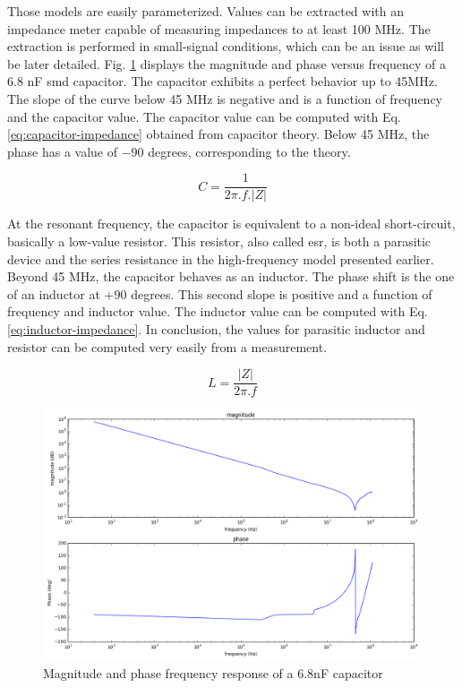 Those models are easily parameterized.
Values can be extracted with an impedance meter capable of measuring impedances to at least 100 MHz.
The extraction is performed in small-signal conditions, which can be an issue as will be later detailed.
Fig. \ref{fig:frequency-response-capa} displays the magnitude and phase versus frequency of a 6.8 nF \gls{smd} capacitor.
The capacitor exhibits a perfect behavior up to 45MHz.
The slope of the curve below 45 MHz is negative and is a function of frequency and the capacitor value.
The capacitor value can be computed with Eq. \ref{eq:capacitor-impedance} obtained from capacitor theory.
Below 45 MHz, the phase has a value of $-90$ degrees, corresponding to the theory.

\begin{equation}
C = \frac{1}{2\pi .f.\lvert Z \rvert}
\label{eq:capacitor-impedance}
\end{equation}

At the resonant frequency, the capacitor is equivalent to a non-ideal short-circuit, basically a low-value resistor.
This resistor, also called \gls{esr}, is both a parasitic device and the series resistance in the high-frequency model presented earlier.
Beyond 45 MHz, the capacitor behaves as an inductor.
The phase shift is the one of an inductor at $+90$ degrees.
This second slope is positive and a function of frequency and inductor value.
The inductor value can be computed with Eq. \ref{eq:inductor-impedance}.
In conclusion, the values for parasitic inductor and resistor can be computed very easily from a measurement.

\begin{equation}
L = \frac{\lvert Z \rvert}{2\pi .f}
\label{eq:inductor-impedance}
\end{equation}

\begin{figure}[!h]
  \centering
  \includegraphics[width=\textwidth]{src/2/figures/capa_hf_response.png}
  \caption{Magnitude and phase frequency response of a 6.8nF capacitor}
  \label{fig:frequency-response-capa}
\end{figure}

